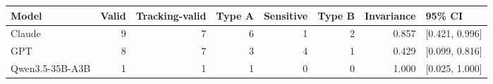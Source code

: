 \begin{tabular}{lrrrrrrl}
\toprule
Model & Valid & Tracking-valid & Type A & Sensitive & Type B & Invariance & 95\% CI \\
\midrule
Claude & 9 & 7 & 6 & 1 & 2 & 0.857 & [0.421, 0.996] \\
GPT & 8 & 7 & 3 & 4 & 1 & 0.429 & [0.099, 0.816] \\
Qwen3.5-35B-A3B & 1 & 1 & 1 & 0 & 0 & 1.000 & [0.025, 1.000] \\
\bottomrule
\end{tabular}
